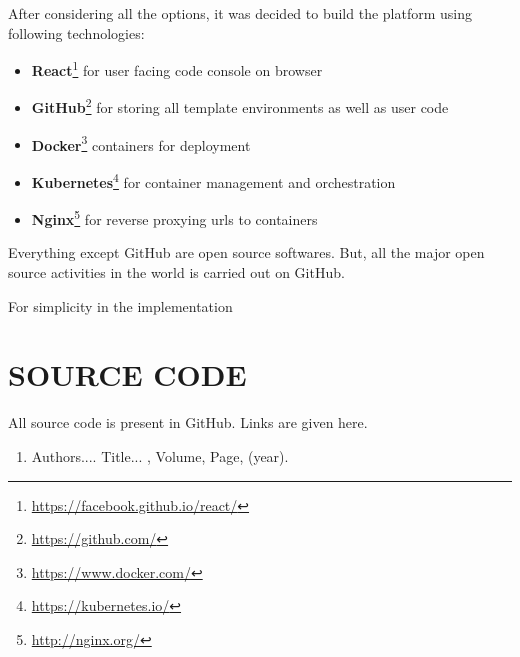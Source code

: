 \documentclass[DD]{iitmdiss}
\begin{document}
After considering all the options, it was decided to build the platform using following technologies:
\begin{itemize}
	\item \textbf{React}\footnote{\url{https://facebook.github.io/react/}} for user facing code console on browser
	\item \textbf{GitHub}\footnote{\label{github_website}\url{https://github.com/}} for storing all template environments as well as user code
	\item \textbf{Docker}\footnote{\url{https://www.docker.com/}} containers for deployment
	\item \textbf{Kubernetes}\footnote{\url{https://kubernetes.io/}} for container management and orchestration
	\item \textbf{Nginx}\footnote{\url{http://nginx.org/}} for reverse proxying urls to containers
\end{itemize}

Everything except GitHub are open source softwares. But, all the major open source activities in the world is carried out on GitHub.

For simplicity in the implementation

\appendix

\chapter{SOURCE CODE}

All source code is present in GitHub. Links are given here.


\begin{singlespace}
	
\end{singlespace}



\listofpapers

\begin{enumerate}  
\item Authors....  \newblock
 Title...
  , Volume,
  Page, (year).
\end{enumerate}  
\end{document}
